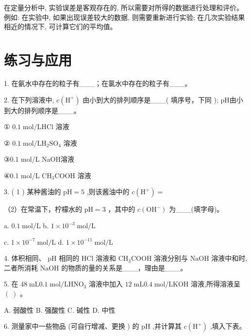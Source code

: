 \documentclass[10pt]{article}
\begin{document}
在定量分析中, 实验误差是客观存在的, 所以需要对所得的数据进行处理和评价。例如: 在实验中, 如果出现误差较大的数据, 则需要重新进行实验; 在几次实验结果相近的情况下, 可计算它们的平均值。

\section*{练习与应用}

1. 在氨水中存在的粒子有\_\_\_；在氯水中存在的粒子有\_\_\_。

2. 在下列溶液中, \(c\left( {\mathrm{H}}^{ + }\right)\) 由小到大的排列顺序是\_\_\_( 填序号，下同 ); pH由小到大的排列顺序是\_\_\_。

① \({0.1}\mathrm{\;{mol}}/\mathrm{L}\mathrm{{HCl}}\) 溶液

② \({0.1}\mathrm{\;{mol}}/\mathrm{L}{\mathrm{H}}_{2}{\mathrm{{SO}}}_{4}\) 溶液

③0.1 mol/L NaOH溶液

④0.1 mol/L \({\mathrm{{CH}}}_{3}\mathrm{{COOH}}\) 溶液

3. ( 1 ) 某种酱油的 \(\mathrm{{pH}} = 5\) ,则该酱油中的 \(c\left( {\mathrm{H}}^{ + }\right) =\)

（2）在常温下，柠檬水的 \(\mathrm{{pH}} = 3\) ，其中的 \(c\left( {\mathrm{{OH}}}^{ - }\right)\) 为\_\_\_(填字母)。

a. \({0.1}\mathrm{\;{mol}}/\mathrm{L}\) b. \(1 \times {10}^{-3}\mathrm{\;{mol}}/\mathrm{L}\)

c. \(1 \times {10}^{-7}\mathrm{\;{mol}}/\mathrm{L}\) d. \(1 \times {10}^{-{11}}\mathrm{\;{mol}}/\mathrm{L}\)

4. 体积相同、 \(\mathrm{{pH}}\) 相同的 \(\mathrm{{HCl}}\) 溶液和 \({\mathrm{{CH}}}_{3}\mathrm{{COOH}}\) 溶液分别与 \(\mathrm{{NaOH}}\) 溶液中和时,二者所消耗 \(\mathrm{{NaOH}}\) 的物质的量的关系是\_\_\_，理由是\_\_\_。

5. 在 \({48}\mathrm{\;{mL}}{0.1}\mathrm{\;{mol}}/\mathrm{L}{\mathrm{{HNO}}}_{3}\) 溶液中加入 \({12}\mathrm{\;{mL}}{0.4}\mathrm{\;{mol}}/\mathrm{L}\mathrm{{KOH}}\) 溶液,所得溶液呈 \(\left( \;\right)\) 。

A. 弱酸性 B. 强酸性 C. 碱性 D. 中性

6. 测量家中一些物品 (可自行增减、更换 ) 的 \(\mathrm{{pH}}\) ,并计算其 \(c\left( {\mathrm{H}}^{ + }\right)\) ,填入下表。

\begin{center}
\end{center}
\end{document}
